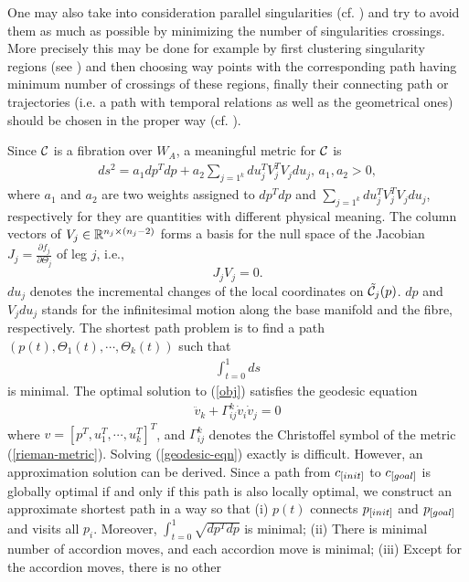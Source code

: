 One may also take into consideration parallel singularities (cf.
\cite{SG95}) and try to avoid them as much as possible by
minimizing the number of singularities crossings. More precisely
this may be done for example by first clustering singularity
regions (see \cite{DCSY03}) and then choosing way points with the
corresponding path having minimum number of crossings of these
regions, finally their connecting path or trajectories (i.e. a
path with temporal relations as well as the geometrical ones)
should be chosen in the proper way (cf. \cite{NTU00}).

Since ${\cal C}$ is a fibration over $W_A$, a meaningful metric
for ${\cal C}$ is
\begin{eqnarray}
\label{rieman-metric}
  ds^2=a_1 dp^Tdp+ a_2\sum_{j=1^k} du_j^TV_j^TV_jdu_j,\, a_1, a_2>0,
\end{eqnarray}
where $a_1$ and $a_2$ are two weights assigned to $dp^Tdp$ and
$\sum_{j=1^k} du_j^TV_j^TV_jdu_j$, respectively for they are
quantities with different physical meaning. The column vectors of
$V_j \in {\Bbb R}^{n_j \times (n_j-2)}$ forms a basis for the null
space of the Jacobian $J_j=\frac{\partial f_j}{\partial \Theta_j}$
of leg $j$, i.e.,
\[
    J_jV_j=0.
\]
$du_j$ denotes the incremental changes of the local coordinates on
$\tilde {\cal C}_j(p)$. $dp$ and $V_j du_j$ stands for the
infinitesimal motion along the base manifold and the fibre,
respectively. The shortest path problem is to find a path
$(p(t),\Theta_1(t),\cdots,\Theta_k(t))$ such that
\begin{eqnarray}
\label{obj}
   \int_{t=0}^1 ds
\end{eqnarray}
is minimal. The optimal solution to (\ref{obj}) satisfies the
geodesic equation
\begin{eqnarray}
\label{geodesic-eqn}
   {\ddot v}_k+\Gamma_{ij}^k {\dot v}_i {\dot v}_j=0
\end{eqnarray}
where $v=[p^T,u_1^T,\cdots,u_k^T]^T$, and $\Gamma_{ij}^k$ denotes
the Christoffel symbol of the metric (\ref{rieman-metric}).
Solving (\ref{geodesic-eqn}) exactly is difficult. However, an
approximation solution can be derived. Since a path from
$c_{\textit{\rm{[}}init]}$ to $c_{\textit{\rm{[}}goal]}$ is globally optimal if and
only if this path is also locally optimal, we construct an
approximate shortest path in a way so that (i) $p(t)$ connects
$p_{\textit{\rm{[}}init]}$ and $p_{\textit{\rm{[}}goal]}$ and visits all $p_i$.
Moreover, $\int_{t=0}^1 \sqrt{dp^Tdp}$ is minimal; (ii) There is
minimal number of accordion moves, and each accordion move is
minimal; (iii) Except for the accordion moves, there is no other
